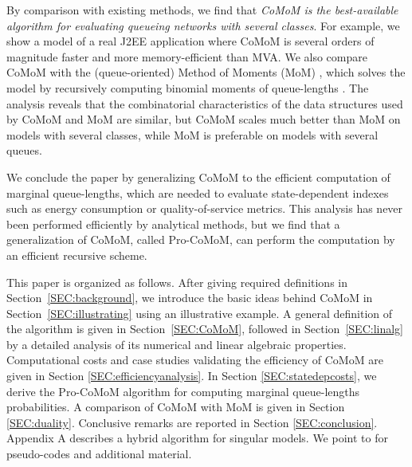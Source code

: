 \documentclass[journal,twocolumn,9.5pt]{IEEEtran}
\begin{document}
By comparison with existing methods, we find that \textit{CoMoM is the best-available algorithm for evaluating queueing networks with several classes}. For example, we show a model of a real J2EE application where CoMoM is several orders of magnitude faster and more memory-efficient than MVA. We also compare CoMoM with the (queue-oriented) Method of Moments (MoM) \cite{Cas06b,Cas07}, which solves the model by recursively computing binomial moments of queue-lengths \cite{Cas07}. The analysis reveals that the combinatorial characteristics of the data structures used by CoMoM and MoM are similar, but CoMoM scales much better than MoM on models with several classes, while MoM is preferable on models with several queues.


We conclude the paper by generalizing CoMoM to the efficient computation of marginal queue-lengths, which are needed to evaluate state-dependent indexes such as energy consumption or quality-of-service metrics. This analysis has never been performed efficiently by analytical methods, but we find that a generalization of CoMoM, called Pro-CoMoM, can perform the computation by an efficient recursive scheme. %

This paper is organized as follows. After giving required definitions in Section~\ref{SEC:background}, we introduce the basic ideas behind CoMoM in Section~\ref{SEC:illustrating} using an illustrative example. A general definition of the algorithm is given in Section~\ref{SEC:CoMoM}, followed in Section~\ref{SEC:linalg} by a detailed analysis of its numerical and linear algebraic properties. Computational costs and case studies validating the efficiency of CoMoM are given in Section \ref{SEC:efficiencyanalysis}. In Section \ref{SEC:statedepcosts}, we derive the Pro-CoMoM algorithm for computing marginal queue-lengths probabilities. A comparison of CoMoM with MoM is given in Section \ref{SEC:duality}. Conclusive remarks are reported in Section \ref{SEC:conclusion}. Appendix A describes a hybrid algorithm for singular models. We point to \cite{TR} for pseudo-codes and additional material.
\end{document}
